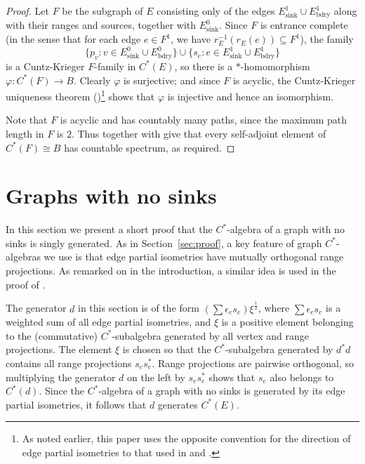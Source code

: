 \documentclass[12pt, a4paper]
{amsart}
\theoremstyle{definition}
\theoremstyle{remark}
\numberwithin{equation}{section}
\newcommand{\Esink}{E^0_{\mathrm{sink}}}
\newcommand{\Eboundary}{E^0_{\mathrm{bdry}}}
\newcommand{\edgesink}{E^1_{\mathrm{sink}}}
\newcommand{\edgebdy}{E^1_{\mathrm{bdry}}}
\newcommand{\Cstar}{\ensuremath{C^*}}
\begin{document}
\begin{proof}
    Let $F$ be the subgraph of $E$ consisting only of the edges $\edgesink \cup \edgebdy$ along with their ranges and sources, together with $\Esink$. Since $F$ is entrance complete (in the sense that for each edge $e \in F^1$, we have $r_E^{-1}(r_E(e)) \subseteq F^1$), the family
    \begin{equation}
        \{p_v : v \in \Esink \cup \Eboundary\} \cup \{s_e : e \in \edgesink \cup \edgebdy\}
    \end{equation}  
    is a Cuntz-Krieger $F$-family in $C^*(E)$, so there is a $*$-homomorphism $\varphi\colon C^*(F) \to B$. Clearly $\varphi$ is surjective; and since $F$ is acyclic, the Cuntz-Krieger uniqueness theorem (\cite[Theorem~2]{Fowler-Laca-Raeburn})\footnote{As noted earlier, this paper uses the opposite convention for the direction of edge partial isometries to that used in \cite{Fowler-Laca-Raeburn} and \cite{Rangaswamy-Tomforde}.} shows that $\varphi$ is injective and hence an isomorphism.

    Note that $F$ is acyclic and has countably many paths, since the maximum path length in $F$ is $2$. Thus \cite[Theorem~6.5]{Rangaswamy-Tomforde} together with \cite{Huruya} give that every self-adjoint element of $\Cstar(F) \cong B$ has countable spectrum, as required.
\end{proof}



\section{Graphs with no sinks}
\label{sec:no-sink}

In this section we present a short proof that the \Cstar-algebra of a graph with no sinks is singly generated. As in Section~\ref{sec:proof}, a key feature of graph \Cstar-algebras we use is that edge partial isometries have mutually orthogonal range projections. As remarked on in the introduction, a similar idea is used in the proof of \cite[Theorem~2.4]{TW14}.

The generator $d$ in this section is of the form $\left( \sum \epsilon_e {s_e} \right) \xi^{\frac{1}{2}}$, where $\sum \epsilon_e {s_e}$ is a weighted sum of all edge partial isometries, and $\xi$ is a positive element belonging to the (commutative) \Cstar-subalgebra generated by all vertex and range projections. The element $\xi$ is chosen so that the \Cstar-subalgebra generated by $d^*d$ contains all range projections $s_e s_e^*$. Range projections are pairwise orthogonal, so multiplying the generator $d$ on the left by $s_e s_e^*$ shows that $s_e$ also belongs to $\Cstar(d)$. Since the \Cstar-algebra of a graph with no sinks is generated by its edge partial isometries, it follows that $d$ generates $\Cstar(E)$.
\end{document}
